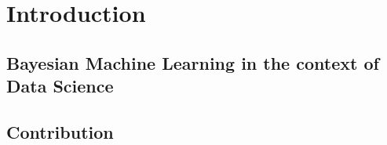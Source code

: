 \documentclass[a4paper,12pt ]{report}
\begin{document}
\pagestyle{empty}
\singlespacing

\onehalfspacing

\singlespacing


\clearpage

\setcounter{page}{0}
\pagestyle{plain}
\tableofcontents

\clearpage





\onehalfspacing


\chapter{Introduction}
\setcounter{page}{1} 

\section{Bayesian Machine Learning in the context of Data Science}





\section{Contribution}


\clearpage


\end{document}

